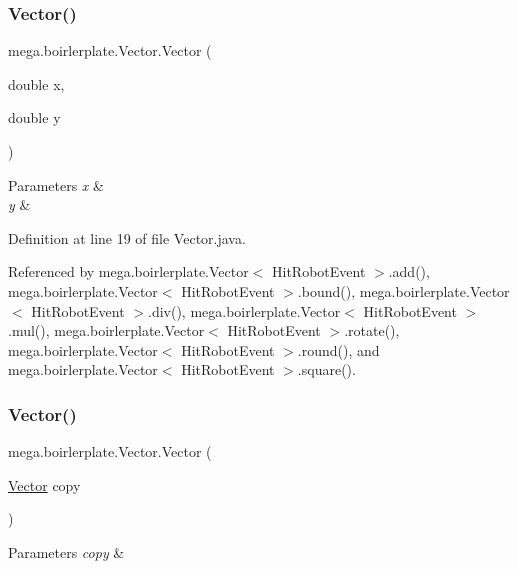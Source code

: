 \subsubsection{\texorpdfstring{Vector()}{Vector()}\hspace{0.1cm}{\footnotesize\ttfamily [1/2]}}
{\footnotesize\ttfamily mega.\+boirlerplate.\+Vector.\+Vector (\begin{DoxyParamCaption}\item[{double}]{x,  }\item[{double}]{y }\end{DoxyParamCaption})}


\begin{DoxyParams}{Parameters}
{\em x} & \\
\hline
{\em y} & \\
\hline
\end{DoxyParams}


Definition at line 19 of file Vector.\+java.



Referenced by mega.\+boirlerplate.\+Vector$<$ Hit\+Robot\+Event $>$.\+add(), mega.\+boirlerplate.\+Vector$<$ Hit\+Robot\+Event $>$.\+bound(), mega.\+boirlerplate.\+Vector$<$ Hit\+Robot\+Event $>$.\+div(), mega.\+boirlerplate.\+Vector$<$ Hit\+Robot\+Event $>$.\+mul(), mega.\+boirlerplate.\+Vector$<$ Hit\+Robot\+Event $>$.\+rotate(), mega.\+boirlerplate.\+Vector$<$ Hit\+Robot\+Event $>$.\+round(), and mega.\+boirlerplate.\+Vector$<$ Hit\+Robot\+Event $>$.\+square().

\mbox{\label{classmega_1_1boirlerplate_1_1_vector_a24a3a81767c1ebf4be37180548c4d299}} 
\subsubsection{\texorpdfstring{Vector()}{Vector()}\hspace{0.1cm}{\footnotesize\ttfamily [2/2]}}
{\footnotesize\ttfamily mega.\+boirlerplate.\+Vector.\+Vector (\begin{DoxyParamCaption}\item[{\hyperlink{classmega_1_1boirlerplate_1_1_vector}{Vector}}]{copy }\end{DoxyParamCaption})}


\begin{DoxyParams}{Parameters}
{\em copy} & \\
\hline
\end{DoxyParams}


